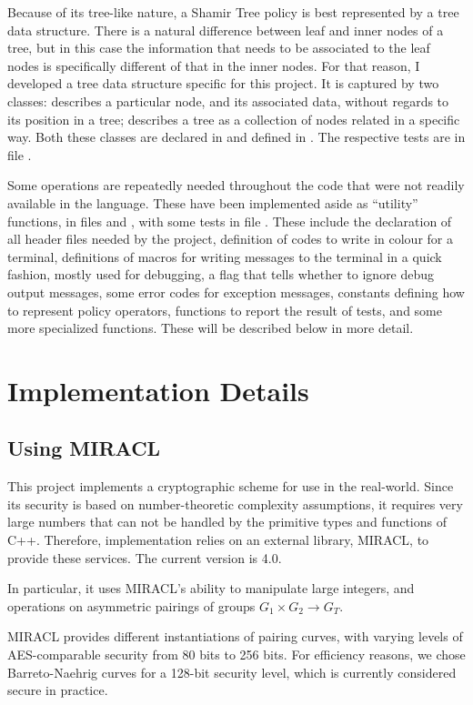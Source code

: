 \documentclass{article}
\begin{document}
Because of its tree-like nature, a Shamir Tree policy is best represented by a tree data structure. There is a natural difference between leaf and inner nodes of a tree, but in this case the information that needs to be associated to the leaf nodes is specifically different of that in the inner nodes. For that reason, I developed a tree data structure specific for this project. It is captured by two classes: \cnode describes a particular node, and its associated data, without regards to its position in a tree; \ctree describes a tree as a collection of nodes related in a specific way. Both these classes are declared in \fhtree and defined in \fctree. The respective tests are in file \fttree.

Some operations are repeatedly needed throughout the code that were not readily available in the language. These have been implemented aside as ``utility'' functions, in files \fhutils and \fcutils, with some tests in file \ftutils. These include the declaration of all header files needed by the project, definition of codes to write in colour for a terminal, definitions of macros for writing messages to the terminal in a quick fashion, mostly used for debugging, a flag that tells whether to ignore debug output messages, some error codes for exception messages, constants defining how to represent policy operators, functions to report the result of tests, and some more specialized functions. These will be described below in more detail.


\section{Implementation Details}

\subsection{Using MIRACL}
\label{sec_miracl}
This project implements a cryptographic scheme for use in the real-world. Since its security is based on number-theoretic complexity assumptions, it requires very large numbers that can not be handled by the primitive types and functions of C++. Therefore, implementation relies on an external library, MIRACL, to provide these services. The current version is 4.0.

In particular, it uses MIRACL's ability to manipulate large integers, and operations on asymmetric pairings of groups $G_1 \times G_2 \to G_T$.

MIRACL provides different instantiations of pairing curves, with varying levels of AES-comparable security from 80 bits to 256 bits. For efficiency reasons, we chose Barreto-Naehrig curves for a 128-bit security level, which is currently considered secure in practice. 
\end{document}
